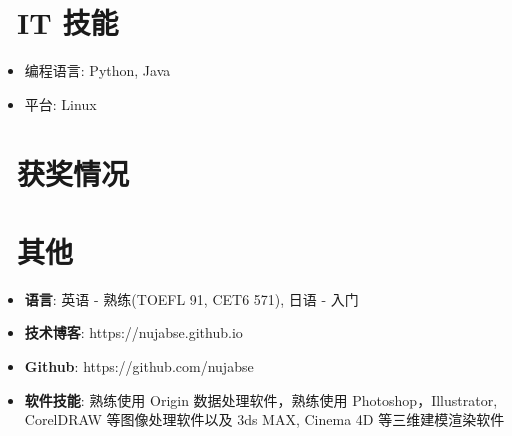 \documentclass{resume}
\begin{document}
\section{\faCogs\ IT 技能}
\begin{itemize}[parsep=0.5ex]
  \item 编程语言: Python, Java
  \item 平台: Linux
\end{itemize}

\section{\faHeartO\ 获奖情况}

\section{\faInfo\ 其他}
\begin{itemize}[parsep=0.5ex]
  \item \textbf{语言}: 英语 - 熟练(TOEFL 91, CET6 571), 日语 - 入门
  \item \textbf{技术博客}: https://nujabse.github.io
  \item \textbf{Github}: https://github.com/nujabse
  \item \textbf{软件技能}: 熟练使用 Origin 数据处理软件，熟练使用 Photoshop，Illustrator, CorelDRAW 等图像处理软件以及 3ds MAX, Cinema 4D 等三维建模渲染软件
\end{itemize}

%
%
\end{document}
